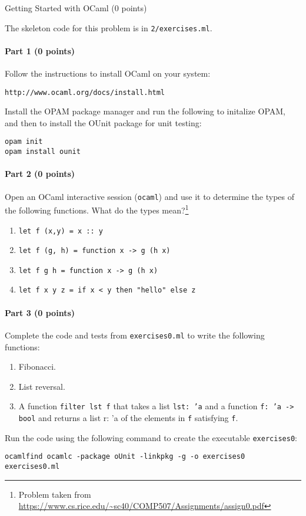 \documentclass[11pt]{article}
\begin{document}
\newpage
\begin{problem}{Getting Started with OCaml (0 points)}

The skeleton code for this problem is in \texttt{2/exercises.ml}.

\paragraph{Part 1 (0 points)}

Follow the instructions to install OCaml on your system:
\begin{verbatim}
http://www.ocaml.org/docs/install.html
\end{verbatim}

Install the OPAM package manager and run the following to initalize OPAM, and then to install the OUnit package for unit testing:
\begin{verbatim}
opam init
opam install ounit
\end{verbatim}

\paragraph{Part 2 (0 points)}

Open an OCaml interactive session (\texttt{ocaml}) and use it to determine the types of the following functions. What do the types mean?\footnote{Problem taken from \url{https://www.cs.rice.edu/~sc40/COMP507/Assignments/assign0.pdf}}
\begin{enumerate}
\item \texttt{let f (x,y) = x :: y}
\item \texttt{let f (g, h) = function x -> g (h x)}
\item \texttt{let f g h = function x -> g (h x)}
\item \texttt{let f x y z = if x < y then "hello" else z}
\end{enumerate}

\paragraph{Part 3 (0 points)}

Complete the code and tests from \texttt{exercises0.ml} to write the following functions:
\begin{enumerate}
\item Fibonacci.
\item List reversal.
\item A function \texttt{filter lst f} that takes a list \texttt{lst: 'a} and a function \texttt{f: 'a -> bool} and returns a list {r: 'a} of the elements in \texttt{f} satisfying \texttt{f}.
\end{enumerate}
Run the code using the following command to create the executable \texttt{exercises0}:
\begin{verbatim}
ocamlfind ocamlc -package oUnit -linkpkg -g -o exercises0 exercises0.ml 
\end{verbatim}


\end{problem}
\end{document}

